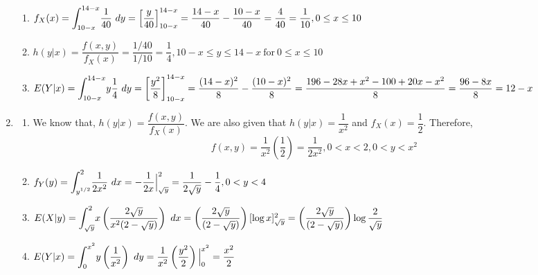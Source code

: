 \documentclass{article}
\newcommand\mfrac[2]{\left(\dfrac{#1}{#2}\right)}
\newcommand\lint{\mathlarger{\int}}
\begin{document}
\begin{enumerate}
\begin{enumerate}
       \item
	$f_X(x) = \lint_{10-x}^{14-x} {\dfrac{1}{40}\ dy} = 
	  \left[\dfrac{y}{40}\right]_{10-x}^{14-x} = \dfrac{14-x}{40} - \dfrac{10-x}{40} = 
	  \dfrac{4}{40} = \dfrac{1}{10}, 0 \le x \le 10$
       
       \item
	$h(y|x) = \dfrac{f(x,y)}{f_X(x)} = \dfrac{1/40}{1/10} = \dfrac{1}{4}
	  , 10-x \le y \le 14-x\ \text{for}\ 0 \le x \le 10$
       
       \item
	$E(Y|x) = \lint_{10-x}^{14-x} {y \dfrac{1}{4}\ dy} = 
	  \left[\dfrac{y^2}{8}\right]_{10-x}^{14-x} = \dfrac{(14-x)^2}{8} - \dfrac{(10-x)^2}{8} = 
	  \dfrac{196 - 28x + x^2 - 100 + 20x - x^2}{8} \\ 
	  = \dfrac{96 - 8x}{8} = 12 - x$       
      \end{enumerate}      
     \addtocounter{enumi}{1}
     
     \item
      \begin{enumerate}
       \item 
	We know that, $h(y|x) = \dfrac{f(x,y)}{f_X(x)}$. We are also given that $h(y|x) = 
	\dfrac{1}{x^2}$ and $f_X(x) = \dfrac{1}{2}$. Therefore,
	$$f(x,y) = \dfrac{1}{x^2}\mfrac{1}{2} = \dfrac{1}{2x^2}, 0 < x < 2, 0 < y < x^2$$
       
       \item
	$f_Y(y) = \lint_{y^{1/2}}^2 {\dfrac{1}{2x^2}\ dx} = -\dfrac{1}{2x} \Big|_{\sqrt{y}}^2 =
	  \dfrac{1}{2\sqrt{y}} - \dfrac{1}{4}, 0 < y < 4$
       
       \item
	$E(X|y) = \lint_{\sqrt{y}}^2 {x \mfrac{2\sqrt{y}}{x^2(2-\sqrt{y})}\ dx} = 
	  \mfrac{2\sqrt{y}}{(2-\sqrt{y})} [\log{x}]_{\sqrt{y}}^2 = 
	  \mfrac{2\sqrt{y}}{(2-\sqrt{y})} \log{\dfrac{2}{\sqrt{y}}}$
       
       \item
	$E(Y|x) = \lint_0^{x^2} {y \mfrac{1}{x^2}\ dy} = \dfrac{1}{x^2} \mfrac{y^2}{2}\Big|_0^{x^2}
	= \dfrac{x^2}{2}$
      \end{enumerate}
    \end{enumerate}
\end{document}
